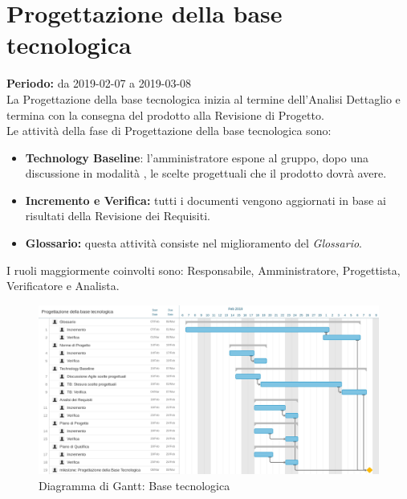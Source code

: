 \section{Progettazione della base tecnologica}
\textbf{Periodo:} da 2019-02-07 a 2019-03-08\\
La Progettazione della base tecnologica inizia al termine dell’Analisi Dettaglio e termina con la consegna del prodotto alla Revisione di Progetto.\\
Le attività della fase di Progettazione della base tecnologica sono:
\begin{itemize}
    \item \textbf{Technology Baseline}: l'amministratore espone al gruppo, dopo una discussione in modalità , le scelte progettuali che il prodotto dovrà avere.
    \item \textbf{Incremento e Verifica:} tutti i documenti vengono aggiornati in base ai risultati della Revisione dei Requisiti.
    \item \textbf{Glossario:} questa attività consiste nel miglioramento del \textit{Glossario}.
\end{itemize}
I ruoli maggiormente coinvolti sono: Responsabile, Amministratore, Progettista, Verificatore e Analista.
\begin{figure} [h]
    \centering
    \includegraphics[scale=0.1]{./images/base_tecnologica.jpg}
    \caption{Diagramma di Gantt: Base tecnologica }\label{}
\end{figure}
\newpage
